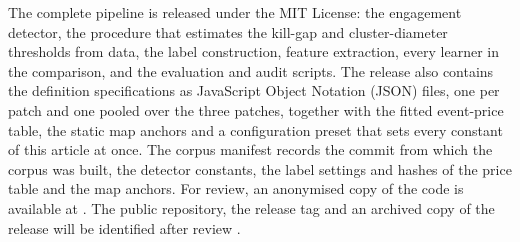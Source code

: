 The complete pipeline is released under the MIT License: the engagement detector, the procedure
that estimates the kill-gap and cluster-diameter thresholds from data, the label construction,
feature extraction, every learner in the comparison, and the evaluation and audit scripts. The
release also contains the definition specifications as JavaScript Object Notation (JSON) files, one
per patch and one pooled over the three patches, together with the fitted event-price table, the
static map anchors and a configuration preset that sets every constant of this article at once.
The corpus manifest records the commit from which the corpus was built, the detector constants,
the label settings and hashes of the price table and the map anchors.
For review, an anonymised copy of the code is available at
.
The public repository, the release tag and an archived copy of the release will be identified
after review .

